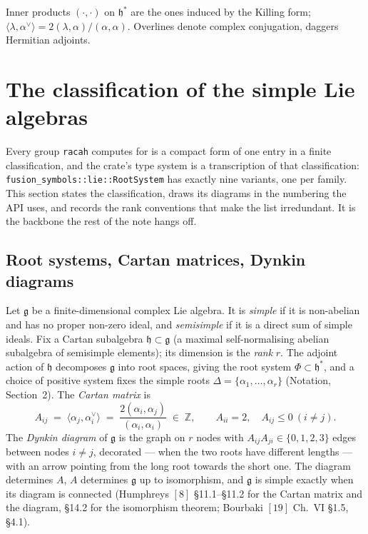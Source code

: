 \documentclass[11pt,a4paper]{article}
\theoremstyle{plain}
\theoremstyle{definition}
\newcommand{\g}{\mathfrak{g}}
\newcommand{\ZZ}{\mathbb{Z}}
\newcommand{\code}[1]{\texttt{#1}}
\begin{document}

\medskip
Inner products $(\cdot,\cdot)$ on $\mathfrak{h}^*$ are the ones induced by the
Killing form; $\langle\lambda,\alpha^\vee\rangle = 2(\lambda,\alpha)/(\alpha,\alpha)$.
Overlines denote complex conjugation, daggers Hermitian adjoints.

\section{The classification of the simple Lie algebras}
\label{sec:classification}

Every group \code{racah} computes for is a compact form of one entry in a
finite classification, and the crate's type system is a transcription of that
classification: \code{fusion\_symbols::lie::RootSystem} has exactly nine variants,
one per family. This section states the classification, draws its diagrams in
the numbering the API uses, and records the rank conventions that make the
list irredundant. It is the backbone the rest of the note hangs off.

\subsection{Root systems, Cartan matrices, Dynkin diagrams}

Let $\g$ be a finite-dimensional complex Lie algebra. It is \emph{simple} if
it is non-abelian and has no proper non-zero ideal, and \emph{semisimple} if
it is a direct sum of simple ideals. Fix a Cartan subalgebra
$\mathfrak{h}\subset\g$ (a maximal self-normalising abelian subalgebra of
semisimple elements); its dimension is the \emph{rank} $r$. The adjoint action
of $\mathfrak{h}$ decomposes $\g$ into root spaces, giving the root system
$\Phi\subset\mathfrak{h}^*$, and a choice of positive system fixes the simple
roots $\Delta=\{\alpha_1,\dots,\alpha_r\}$ (Notation, Section~2). The
\emph{Cartan matrix} is
\begin{equation}\label{eq:cartan}
  A_{ij} \;=\; \langle \alpha_j, \alpha_i^\vee\rangle
        \;=\; \frac{2(\alpha_i,\alpha_j)}{(\alpha_i,\alpha_i)}
        \;\in\;\ZZ,
  \qquad A_{ii}=2,\quad A_{ij}\le 0 \ (i\neq j).
\end{equation}
The \emph{Dynkin diagram} of $\g$ is the graph on $r$ nodes with
$A_{ij}A_{ji}\in\{0,1,2,3\}$ edges between nodes $i\neq j$, decorated --- when
the two roots have different lengths --- with an arrow pointing from the long
root towards the short one. The diagram determines $A$, $A$ determines $\g$
up to isomorphism, and $\g$ is simple exactly when its diagram is connected
(Humphreys $[8]$ \S11.1--\S11.2 for the Cartan matrix and the diagram,
\S14.2 for the isomorphism theorem; Bourbaki $[19]$ Ch.~VI \S1.5, \S4.1).
\end{document}
